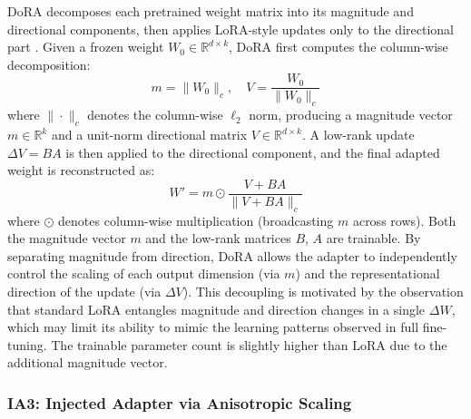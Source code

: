 \documentclass{article}
\begin{document}
DoRA decomposes each pretrained weight matrix into its magnitude and directional components, then applies LoRA-style updates only to the directional part \cite{liu2024dora}. Given a frozen weight $W_0 \in \mathbb{R}^{d \times k}$, DoRA first computes the column-wise decomposition:
\begin{equation}
\label{eq:dora_decomp}
m = \|W_0\|_c, \quad V = \frac{W_0}{\|W_0\|_c}
\end{equation}
where $\|\cdot\|_c$ denotes the column-wise $\ell_2$ norm, producing a magnitude vector $m \in \mathbb{R}^k$ and a unit-norm directional matrix $V \in \mathbb{R}^{d \times k}$. A low-rank update $\Delta V = BA$ is then applied to the directional component, and the final adapted weight is reconstructed as:
\begin{equation}
\label{eq:dora_update}
W' = m \odot \frac{V + BA}{\|V + BA\|_c}
\end{equation}
where $\odot$ denotes column-wise multiplication (broadcasting $m$ across rows). Both the magnitude vector $m$ and the low-rank matrices $B$, $A$ are trainable. By separating magnitude from direction, DoRA allows the adapter to independently control the scaling of each output dimension (via $m$) and the representational direction of the update (via $\Delta V$). This decoupling is motivated by the observation that standard LoRA entangles magnitude and direction changes in a single $\Delta W$, which may limit its ability to mimic the learning patterns observed in full fine-tuning. The trainable parameter count is slightly higher than LoRA due to the additional magnitude vector.

\subsubsection{IA3: Injected Adapter via Anisotropic Scaling}
\end{document}
